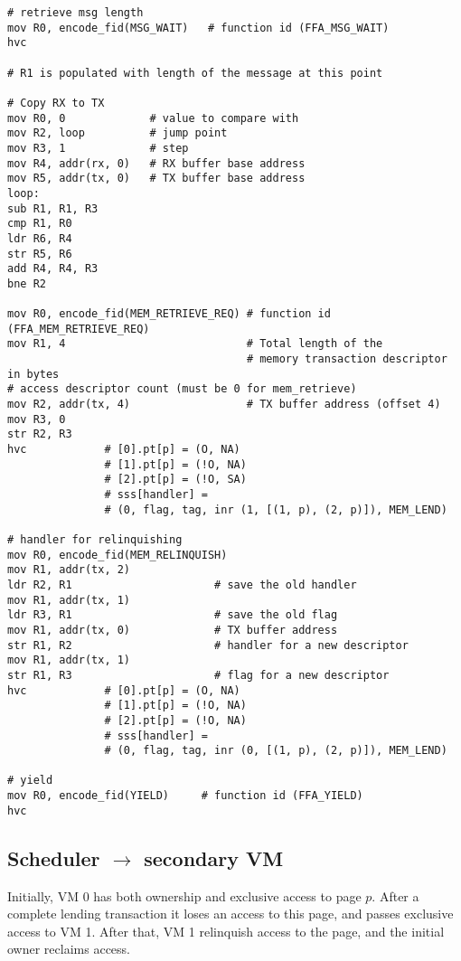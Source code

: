 \documentclass{article}
\begin{document}
\begin{lstlisting}[caption={VM 2}]
# retrieve msg length
mov R0, encode_fid(MSG_WAIT)   # function id (FFA_MSG_WAIT)
hvc

# R1 is populated with length of the message at this point

# Copy RX to TX
mov R0, 0             # value to compare with
mov R2, loop          # jump point
mov R3, 1             # step
mov R4, addr(rx, 0)   # RX buffer base address
mov R5, addr(tx, 0)   # TX buffer base address
loop:
sub R1, R1, R3
cmp R1, R0
ldr R6, R4
str R5, R6
add R4, R4, R3
bne R2

mov R0, encode_fid(MEM_RETRIEVE_REQ) # function id (FFA_MEM_RETRIEVE_REQ)
mov R1, 4                            # Total length of the  
                                     # memory transaction descriptor in bytes
# access descriptor count (must be 0 for mem_retrieve)
mov R2, addr(tx, 4)                  # TX buffer address (offset 4)
mov R3, 0
str R2, R3                                    
hvc            # [0].pt[p] = (O, NA)
               # [1].pt[p] = (!O, NA)
               # [2].pt[p] = (!O, SA)
               # sss[handler] = 
               # (0, flag, tag, inr (1, [(1, p), (2, p)]), MEM_LEND)

# handler for relinquishing
mov R0, encode_fid(MEM_RELINQUISH)
mov R1, addr(tx, 2)
ldr R2, R1                      # save the old handler
mov R1, addr(tx, 1)
ldr R3, R1                      # save the old flag
mov R1, addr(tx, 0)             # TX buffer address
str R1, R2                      # handler for a new descriptor
mov R1, addr(tx, 1)
str R1, R3                      # flag for a new descriptor
hvc            # [0].pt[p] = (O, NA)
               # [1].pt[p] = (!O, NA)
               # [2].pt[p] = (!O, NA)
               # sss[handler] = 
               # (0, flag, tag, inr (0, [(1, p), (2, p)]), MEM_LEND)

# yield
mov R0, encode_fid(YIELD)     # function id (FFA_YIELD)
hvc
\end{lstlisting}

\subsection{Scheduler $\rightarrow$ secondary VM}

Initially, VM 0 has both ownership and exclusive access to page $p$. After a complete lending transaction it loses an access to this page, and passes exclusive access to VM 1. After that, VM 1 relinquish access to the page, and the initial owner reclaims access.
\end{document}
